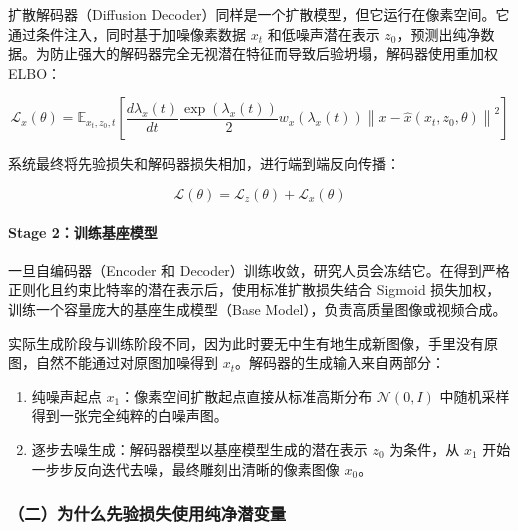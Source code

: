 扩散解码器（Diffusion Decoder）同样是一个扩散模型，但它运行在像素空间。它通过条件注入，同时基于加噪像素数据 \(x_t\) 和低噪声潜在表示 \(z_0\)，预测出纯净数据。为防止强大的解码器完全无视潜在特征而导致后验坍塌，解码器使用重加权 ELBO：

\[
\mathcal{L}_x(\theta)=
\mathbb{E}_{x_t,z_0,t}
\left[
\frac{d\lambda_x(t)}{dt}
\frac{\exp(\lambda_x(t))}{2}
w_x(\lambda_x(t))
\left\|
x-\hat{x}(x_t,z_0,\theta)
\right\|^2
\right]
\]

系统最终将先验损失和解码器损失相加，进行端到端反向传播：

\[
\mathcal{L}(\theta)=\mathcal{L}_z(\theta)+\mathcal{L}_x(\theta)
\]

\hypertarget{stage-2ux8badux7ec3ux57faux5ea7ux6a21ux578b}{%
\paragraph{Stage 2：训练基座模型}\label{stage-2ux8badux7ec3ux57faux5ea7ux6a21ux578b}}

一旦自编码器（Encoder 和 Decoder）训练收敛，研究人员会冻结它。在得到严格正则化且约束比特率的潜在表示后，使用标准扩散损失结合 Sigmoid 损失加权，训练一个容量庞大的基座生成模型（Base Model），负责高质量图像或视频合成。

实际生成阶段与训练阶段不同，因为此时要无中生有地生成新图像，手里没有原图，自然不能通过对原图加噪得到 \(x_t\)。解码器的生成输入来自两部分：

\begin{enumerate}
\def\labelenumi{\arabic{enumi}.}
\tightlist
\item
  纯噪声起点 \(x_1\)：像素空间扩散起点直接从标准高斯分布 \(\mathcal{N}(0,I)\) 中随机采样得到一张完全纯粹的白噪声图。
\item
  逐步去噪生成：解码器模型以基座模型生成的潜在表示 \(z_0\) 为条件，从 \(x_1\) 开始一步步反向迭代去噪，最终雕刻出清晰的像素图像 \(x_0\)。
\end{enumerate}

\hypertarget{ux4e8cux4e3aux4ec0ux4e48ux5148ux9a8cux635fux5931ux4f7fux7528ux7eafux51c0ux6f5cux53d8ux91cf}{%
\subsubsection{（二）为什么先验损失使用纯净潜变量}\label{ux4e8cux4e3aux4ec0ux4e48ux5148ux9a8cux635fux5931ux4f7fux7528ux7eafux51c0ux6f5cux53d8ux91cf}}

